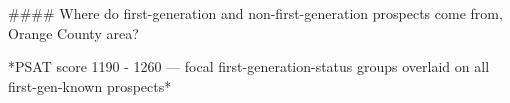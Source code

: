 #### Where do first-generation and non-first-generation prospects come from, Orange County area?

*PSAT score 1190 - 1260 — focal first-generation-status groups overlaid on all first-gen-known prospects*
